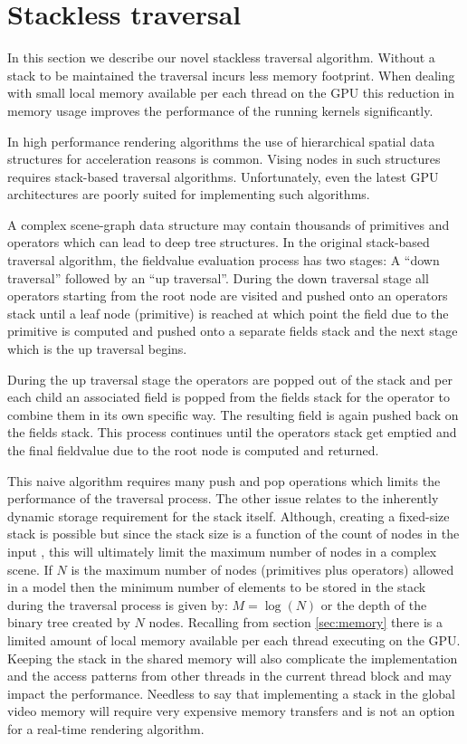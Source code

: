 \section{Stackless \blob traversal}
\label{sec:stackless}
In this section we describe our novel stackless \blob traversal algorithm. 
Without a stack to be maintained the \blob traversal incurs less memory footprint. When dealing with small 
local memory available per each thread on the GPU this reduction in memory usage improves the performance of the 
running kernels significantly.

In high performance rendering algorithms the use of hierarchical spatial data structures for acceleration reasons 
is common. Vising nodes in such structures requires stack-based traversal algorithms. Unfortunately, even the latest 
GPU architectures are poorly suited for implementing such algorithms. 


A complex \blob scene-graph data structure may contain thousands of primitives and operators which can lead to deep tree structures. 
In the original stack-based traversal algorithm, the fieldvalue evaluation process has two stages: A ``down traversal'' followed by an ``up traversal''. 
During the down traversal stage all operators starting from the root node are visited and pushed onto an operators stack until a leaf node (primitive) 
is reached at which point the field due to the primitive is computed and pushed onto a separate fields stack and the next 
stage which is the up traversal begins.

During the up traversal stage the operators are popped out of the stack and per each child an associated field is popped from the fields stack for the 
operator to combine them in its own specific way. The resulting field is again pushed back on the fields stack.  This process continues until the 
operators stack get emptied and the final fieldvalue due to the root node is computed and returned.

This naive algorithm requires many push and pop operations which limits the performance of the traversal process. The other issue relates to the 
inherently dynamic storage requirement for the stack itself. Although, creating a fixed-size stack is possible but since the stack size is a function of
the count of nodes in the input \blob, this will ultimately limit the maximum number of nodes in a complex scene. If $N$ is the maximum number of nodes 
(primitives plus operators) allowed in a \blob model then the minimum number of elements to be stored in the stack during the traversal process 
is given by: $M=\log(N)$ or the depth of the binary tree created by $N$ nodes. Recalling from section \ref{sec:memory} there is a limited amount of
local memory available per each thread executing on the GPU. Keeping the stack in the shared memory will also complicate the implementation and
the access patterns from other threads in the current thread block and may impact the performance. Needless to say that implementing a stack in the global 
video memory will require very expensive memory transfers and is not an option for a real-time rendering algorithm. 

